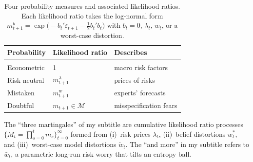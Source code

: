 \documentclass[12pt]{article}
\theoremstyle{definition}
\begin{document}
\begin{table}[H]
\begin{center}
\begin{tabular}{lll}
\textbf{Probability}  & \textbf{Likelihood ratio} & \textbf{Describes} \\
\hline\\[-6pt]
Econometric  &  1 &  macro risk factors \\[4pt]
Risk neutral  & $m_{t+1}^\lambda $ & prices of risks  \\[4pt]
Mistaken &  $m_{t+1}^w $  & experts' forecasts  \\[4pt]
Doubtful & $m_{t+1} \in {\mathcal M} $ & misspecification fears  \\[4pt]
\end{tabular}
\end{center}
\caption{Four probability measures and associated likelihood ratios.
Each likelihood ratio takes the log-normal form
$m_{t+1}^b = \exp\bigl(-b_t' \varepsilon_{t+1} - \tfrac{1}{2} b_t' b_t \bigr)$
with $b_t = 0$, $\lambda_t$, $w_t$, or a worst-case distortion.}
\label{tab:four-measures}
\end{table}

The ``three martingales'' of my subtitle are cumulative likelihood
ratio processes $\{M_t = \prod_{s=0}^t m_s\}_{t=0}^\infty$ formed from (i)~risk prices $\lambda_t$,
(ii)~belief distortions $w_t^*$, and (iii)~worst-case model distortions
$\tilde w_t$.  The ``and more'' in my subtitle refers to $\bar w_t$, a parametric
long-run risk worry that tilts an entropy ball.
\end{document}
